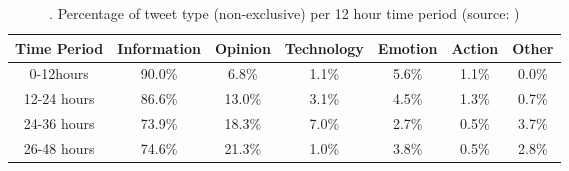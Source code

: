 \begin{table}[]
\centering
\begin{tabular}{ccccccc}
\hline

\multicolumn{1}{|c|}{\small{Time Period}} & \multicolumn{1}{c|}{\small{Information}} & \multicolumn{1}{c|}{\small{Opinion}} & \multicolumn{1}{c|}{\small{Technology}} & \multicolumn{1}{c|}{\small{Emotion}} & \multicolumn{1}{c|}{\small{Action}} & \multicolumn{1}{c|}{\small{Other}} \\ \hline
\multicolumn{1}{|c|}{\small{0-12hours}}   & \multicolumn{1}{c|}{90.0\%}           & \multicolumn{1}{c|}{6.8\%}        & \multicolumn{1}{c|}{1.1\%}           & \multicolumn{1}{c|}{5.6\%}        & \multicolumn{1}{c|}{1.1\%}       & \multicolumn{1}{c|}{0.0\%}      \\ \hline
\multicolumn{1}{|c|}{\small{12-24 hours}} & \multicolumn{1}{c|}{86.6\%}           & \multicolumn{1}{c|}{13.0\%}       & \multicolumn{1}{c|}{3.1\%}           & \multicolumn{1}{c|}{4.5\%}        & \multicolumn{1}{c|}{1.3\%}       & \multicolumn{1}{c|}{0.7\%}      \\ \hline
\multicolumn{1}{|c|}{\small{24-36 hours}} & \multicolumn{1}{c|}{73.9\%}           & \multicolumn{1}{c|}{18.3\%}       & \multicolumn{1}{c|}{7.0\%}           & \multicolumn{1}{c|}{2.7\%}        & \multicolumn{1}{c|}{0.5\%}       & \multicolumn{1}{c|}{3.7\%}      \\ \hline
\multicolumn{1}{|c|}{\small{26-48 hours}} & \multicolumn{1}{c|}{74.6\%}           & \multicolumn{1}{c|}{21.3\%}       & \multicolumn{1}{c|}{1.0\%}           & \multicolumn{1}{c|}{3.8\%}        & \multicolumn{1}{c|}{0.5\%}       & \multicolumn{1}{c|}{2.8\%}      \\ \hline

\end{tabular}
   \caption{. Percentage of tweet type (non-exclusive) per 12 hour time period (source: \cite{heverin2010microblogging})}
\label{Percentage-of-tweet-type}

\end{table}

